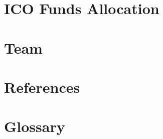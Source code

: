 \documentclass[conference]{IEEEtran}
\begin{document}
\section{\textbf{ICO Funds Allocation}}



\section{\textbf{Team}}

\section{\textbf{References}}

\section{\textbf{Glossary}}


\newpage
\onecolumn
\tableofcontents
\end{document}
